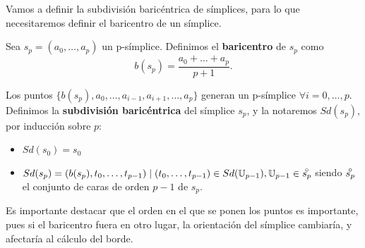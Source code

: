Vamos a definir la subdivisión baricéntrica de símplices, para lo que necesitaremos
definir el baricentro de un símplice.

\begin{definition}
  Sea $s_p = (a_0, \dots, a_p)$ un p-símplice. Definimos el \textbf{baricentro} de $s_p$ como
  \[b(s_p) = \frac{a_0 + \dots + a_p}{p+1}.\]
\end{definition}

Los puntos $\{b(s_p), a_0, \dots, a_{i-1}, a_{i+1}, \dots, a_p\}$ generan un p-símplice $\forall i = 0, \dots, p$.
Definimos la \textbf{subdivisión baricéntrica} del símplice $s_p$, y la notaremos $Sd(s_p)$, por inducción sobre $p$:
\begin{itemize}
  \item $Sd(s_0) = s_0$
  \item $Sd(s_p) = (b(s_p), t_0, \dots, t_{p-1}) \mid (t_0, \dots, t_{p-1}) \in Sd(\U_{p-1}), \U_{p-1} \in \interior{s_p}$
        siendo $\interior{s_p}$ el conjunto de caras de orden $p-1$ de $s_p$.
\end{itemize}

\begin{remark}
  Es importante destacar que el orden en el que se ponen los puntos es importante, pues si el baricentro fuera en otro lugar,
  la orientación del símplice cambiaría, y afectaría al cálculo del borde.
\end{remark}

